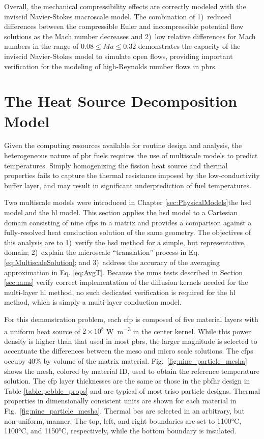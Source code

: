 Overall, the mechanical compressibility effects are correctly modeled with the inviscid Navier-Stokes macroscale model. The combination of 1)~reduced differences between the compressible Euler and incompressible potential flow solutions as the Mach number decreases and 2)~low relative differences for Mach numbers in the range of \(0.08\leq Ma\leq0.32\) demonstrates the capacity of the inviscid Navier-Stokes model to simulate open flows, providing important verification for the modeling of high-Reynolds number flows in \glspl{pbr}.

\section{The Heat Source Decomposition Model}
\label{sec:verification_meso}

Given the computing resources available for routine design and analysis, the heterogeneous nature of \gls{pbr} fuels requires the use of multiscale models to predict temperatures. Simply homogenizing the fission heat source and thermal properties fails to capture the thermal resistance imposed by the low-conductivity buffer layer, and may result in significant underprediction of fuel temperatures. 

Two multiscale models were introduced in Chapter \ref{sec:PhysicalModels}\mdash the \gls{hsd} model and the \gls{hl} model. This section applies the \gls{hsd} model to a Cartesian domain consisting of nine \glspl{cfp} in a matrix and provides a comparison against a fully-resolved heat conduction solution of the same geometry. The objectives of this analysis are to 1)~verify the \gls{hsd} method for a simple, but representative, domain; 2)~explain the microscale ``translation'' process in Eq. \eqref{eq:MultiscaleSolution}; and 3)~address the accuracy of the averaging approximation in Eq. \eqref{eq:AvgT}. Because the \gls{mms} tests described in Section \ref{sec:mms} verify correct implementation of the diffusion kernels needed for the multi-layer \gls{hl} method, no such dedicated verification is required for the \gls{hl} method, which is simply a multi-layer conduction model.

For this demonstration problem, each \gls{cfp} is composed of five material layers with a uniform heat source of \(2\times10^8\) \si{\watt\per\cubic\meter} in the center kernel. While this power density is higher than that used in most \glspl{pbr}, the larger magnitude is selected to accentuate the differences between the meso and micro scale solutions. The \glspl{cfp} occupy 40\% by volume of the matrix material. Fig.\ \ref{fig:nine_particle_mesha} shows the mesh, colored by material ID, used to obtain the reference temperature solution. The \gls{cfp} layer thicknesses are the same as those in the \gls{pbfhr} design in Table \ref{table:pebble_props} and are typical of most \gls{triso} particle designs. Thermal properties in dimensionally consistent units are shown for each material in Fig.\ \ref{fig:nine_particle_mesha}. Thermal \glspl{bc} are selected in an arbitrary, but non-uniform, manner. The top, left, and right boundaries are set to 1100\si{\celsius}, 1100\si{\celsius}, and 1150\si{\celsius}, respectively, while the bottom boundary is insulated.

